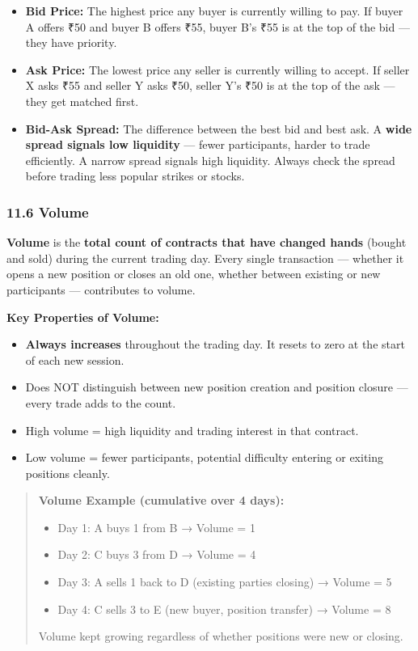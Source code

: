 \documentclass[12pt,openany]{book}
\begin{document}
\begin{itemize}[leftmargin=*]
    \item \textbf{Bid Price:} The highest price any buyer is currently willing to pay. If buyer A offers ₹50 and buyer B offers ₹55, buyer B's ₹55 is at the top of the bid — they have priority.
    \item \textbf{Ask Price:} The lowest price any seller is currently willing to accept. If seller X asks ₹55 and seller Y asks ₹50, seller Y's ₹50 is at the top of the ask — they get matched first.
    \item \textbf{Bid-Ask Spread:} The difference between the best bid and best ask. A \textbf{wide spread signals low liquidity} — fewer participants, harder to trade efficiently. A narrow spread signals high liquidity. Always check the spread before trading less popular strikes or stocks.
\end{itemize}

\subsubsection{11.6 Volume}

\textbf{Volume} is the \textbf{total count of contracts that have changed hands} (bought and sold) during the current trading day. Every single transaction — whether it opens a new position or closes an old one, whether between existing or new participants — contributes to volume.

\textbf{Key Properties of Volume:}
\begin{itemize}[leftmargin=*]
    \item \textbf{Always increases} throughout the trading day. It resets to zero at the start of each new session.
    \item Does NOT distinguish between new position creation and position closure — every trade adds to the count.
    \item High volume = high liquidity and trading interest in that contract.
    \item Low volume = fewer participants, potential difficulty entering or exiting positions cleanly.
\end{itemize}

\begin{quote}
\textbf{Volume Example (cumulative over 4 days):}
\begin{itemize}[leftmargin=*]
    \item Day 1: A buys 1 from B → Volume = 1
    \item Day 2: C buys 3 from D → Volume = 4
    \item Day 3: A sells 1 back to D (existing parties closing) → Volume = 5
    \item Day 4: C sells 3 to E (new buyer, position transfer) → Volume = 8
\end{itemize}
Volume kept growing regardless of whether positions were new or closing.
\end{quote}
\end{document}
